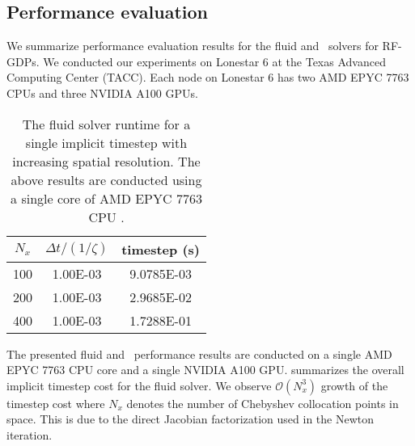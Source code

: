 \subsection{Performance evaluation}
\label{subsec:peformance_glowd}
We summarize performance evaluation results for the fluid and \bte~solvers for RF-GDPs. We conducted our experiments on Lonestar 6 at the Texas Advanced Computing Center (TACC). Each node on Lonestar 6 has two AMD EPYC 7763 CPUs and three NVIDIA A100 GPUs. 
\begin{table}[!tbhp]
	\centering
	\begin{tabular}{||c|c|c||}
		\hline
		$N_x$ & $\Delta t / (1/\zeta) $  & timestep (s) \\
		\hline
		100	  & 1.00E-03        & 9.0785E-03 \\
		200	  & 1.00E-03        & 2.9685E-02 \\
		400	  & 1.00E-03        & 1.7288E-01 \\
		\hline
	\end{tabular}
	\caption{The fluid solver runtime for a single implicit timestep with increasing spatial resolution. The above results are conducted using a single core of AMD EPYC 7763 CPU \label{tab:performance_fluid}.}
\end{table}
The presented fluid and \bte~performance results are conducted on a single AMD EPYC 7763 CPU core and a single NVIDIA A100 GPU.  summarizes the overall implicit timestep cost for the fluid solver. We observe $\mathcal{O}(N_x^3)$ growth of the timestep cost where $N_x$ denotes the number of Chebyshev collocation points in space. This is due to the direct Jacobian factorization used in the Newton iteration. 

